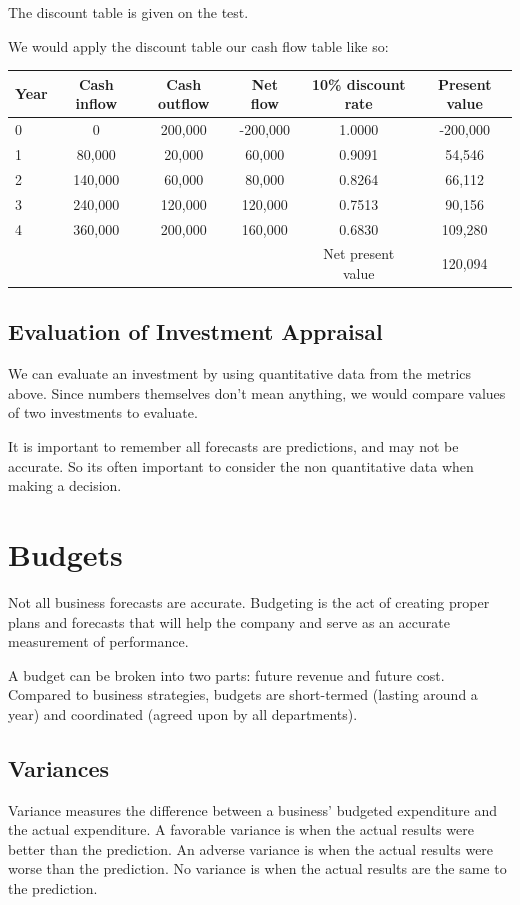 \documentclass{standalone}
\begin{document}
The discount table is given on the test.

We would apply the discount table our cash flow table like so:

\begin{tabular}{l c c c c c}
    Year               & Cash inflow & Cash outflow & Net flow & 10\% discount rate & Present value \\
    \hline
    0                  & 0           & 200,000      & -200,000 & 1.0000             & -200,000 \\
    1                  & 80,000      & 20,000       & 60,000   & 0.9091             & 54,546 \\
    2                  & 140,000     & 60,000       & 80,000   & 0.8264             & 66,112 \\
    3                  & 240,000     & 120,000      & 120,000  & 0.7513             & 90,156 \\
    4                  & 360,000     & 200,000      & 160,000  & 0.6830             & 109,280 \\
                       &             &              &          & Net present value  & 120,094
\end{tabular}

\subsection{Evaluation of Investment Appraisal}
We can evaluate an investment by using quantitative data from the metrics above.
Since numbers themselves don't mean anything, we would compare values of two investments to evaluate.

It is important to remember all forecasts are predictions, and may not be accurate.
So its often important to consider the non quantitative data when making a decision.

\section{Budgets}
Not all business forecasts are accurate. 
Budgeting is the act of creating proper plans and forecasts that will help the company and serve as an accurate measurement of performance.

A budget can be broken into two parts: future revenue and future cost.
Compared to business strategies, budgets are short-termed (lasting around a year) and coordinated (agreed upon by all departments).

\subsection{Variances}
Variance measures the difference between a business' budgeted expenditure and the actual expenditure.
A favorable variance is when the actual results were better than the prediction.
An adverse variance is when the actual results were worse than the prediction.
No variance is when the actual results are the same to the prediction.
\end{document}
